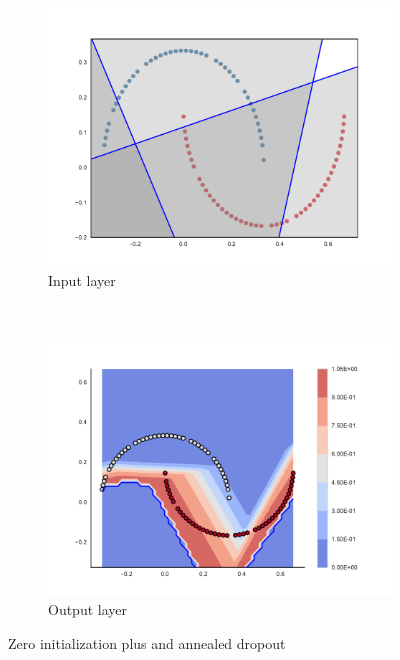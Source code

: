 \begin{figure}
  \centering
    \begin{subfigure}[b]{0.5\textwidth}
        \includegraphics[width=\textwidth]{img/zero/3000/09-conv2d_1-0.pdf}
        \caption{Input layer}
        \label{fig:zerosInput3000}
    \end{subfigure}~ %
    \begin{subfigure}[b]{0.5\textwidth}
        \includegraphics[width=\textwidth]{img/zero/3000/57-09-output.pdf}
        \caption{Output layer}
        \label{fig:zerosOutput3000}
    \end{subfigure}
    
      
  \caption{Zero initialization plus \SepUnitPoint and annealed dropout} 
  \label{fig:zeros} 
\end{figure}

